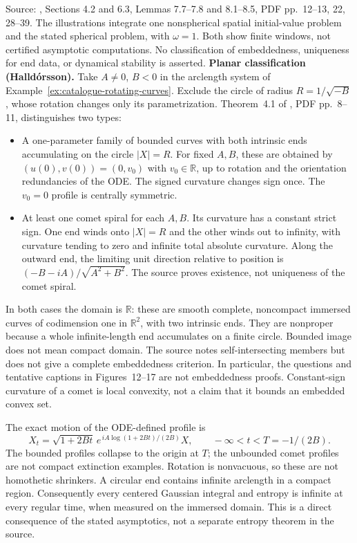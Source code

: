 \begin{example}
Source: \cite{CatAAAW13}, Sections 4.2 and 6.3, Lemmas 7.7--7.8 and 8.1--8.5, PDF pp.~12--13, 22, 28--39. The illustrations integrate one nonspherical spatial initial-value problem and the stated spherical problem, with $\omega=1$. Both show finite windows, not certified asymptotic computations. No classification of embeddedness, uniqueness for end data, or dynamical stability is asserted.
\textbf{Planar classification (Halld\'orsson).}
Take $A\ne0$, $B<0$ in the arclength system of
Example~\ref{ex:catalogue-rotating-curves}. Exclude the circle
of radius $R=1/\sqrt{-B}$, whose rotation changes only its parametrization.
Theorem~4.1 of \cite{CatHalldorsson2012}, PDF pp.~8--11, distinguishes two types:
\begin{itemize}
\item A one-parameter family of bounded curves with both intrinsic ends
accumulating on the circle $|X|=R$. For fixed $A,B$, these are obtained
by $(u(0),v(0))=(0,v_0)$ with $v_0\in\mathbb R$, up to rotation and the
orientation redundancies of the ODE. The signed curvature changes sign once.
The $v_0=0$ profile is centrally symmetric.
\item At least one comet spiral for each $A,B$. Its curvature has a constant
strict sign. One end winds onto $|X|=R$ and the other winds out to infinity,
with curvature tending to zero and infinite total absolute curvature.
Along the outward end, the limiting unit direction relative to position is
$(-B-iA)/\sqrt{A^2+B^2}$. The source proves existence, not uniqueness of
the comet spiral.
\end{itemize}
In both cases the domain is $\mathbb R$: these are smooth complete,
noncompact immersed curves of codimension one in $\mathbb R^2$, with two
intrinsic ends. They are nonproper because a whole infinite-length end
accumulates on a finite circle. Bounded image does not mean compact domain.
The source notes self-intersecting members but does not give a complete
embeddedness criterion. In particular, the questions and tentative captions
in Figures~12--17 are not embeddedness proofs. Constant-sign curvature of a
comet is local convexity, not a claim that it bounds an embedded convex set.

The exact motion of the ODE-defined profile is
\[
 X_t=\sqrt{1+2Bt}\,e^{\,iA\log(1+2Bt)/(2B)}X,
 \qquad -\infty<t<T=-1/(2B).
\]
The bounded profiles collapse to the origin at $T$; the unbounded comet
profiles are not compact extinction examples. Rotation is nonvacuous, so
these are not homothetic shrinkers. A circular end contains infinite
arclength in a compact region. Consequently every centered Gaussian integral
and entropy is infinite at every regular time, when measured on the immersed
domain. This is a direct consequence of the stated asymptotics, not a separate
entropy theorem in the source.


\end{example}
